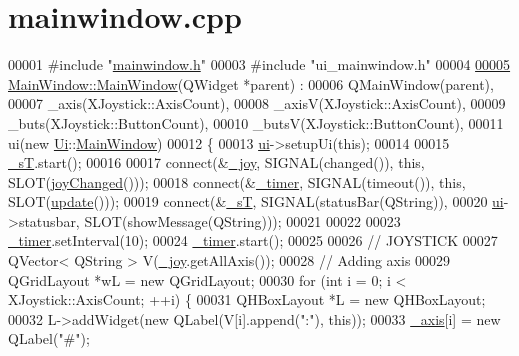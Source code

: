 \hypertarget{a00015_source}{}\section{mainwindow.\+cpp}

\begin{DoxyCode}
00001 \textcolor{preprocessor}{#include "\hyperlink{a00016}{mainwindow.h}"}
00003 \textcolor{preprocessor}{#include "ui\_mainwindow.h"}
00004 
\hypertarget{a00015_source_l00005}{}\hyperlink{a00004_a8b244be8b7b7db1b08de2a2acb9409db}{00005} \hyperlink{a00004_a8b244be8b7b7db1b08de2a2acb9409db}{MainWindow::MainWindow}(QWidget *parent) :
00006     QMainWindow(parent),
00007     \_axis(XJoystick::AxisCount),
00008     \_axisV(XJoystick::AxisCount),
00009     \_buts(XJoystick::ButtonCount),
00010     \_butsV(XJoystick::ButtonCount),
00011     ui(new \hyperlink{a00023}{Ui}::\hyperlink{a00004}{MainWindow})
00012 \{
00013     \hyperlink{a00004_a35466a70ed47252a0191168126a352a5}{ui}->setupUi(\textcolor{keyword}{this});
00014     
00015     \hyperlink{a00004_a97f8ecc7ecb930b796178cef7b975013}{\_sT}.start();
00016     
00017     connect(&\hyperlink{a00004_a671f35800890e518713e1946671d8730}{\_joy}, SIGNAL(changed()), \textcolor{keyword}{this}, SLOT(\hyperlink{a00004_abb4c2d8a79c9f80010ea031366bf8226}{joyChanged}()));
00018     connect(&\hyperlink{a00004_a254b03b878cfda75c1c411a2f8568d33}{\_timer}, SIGNAL(timeout()), \textcolor{keyword}{this}, SLOT(\hyperlink{a00004_a128f71880d4b9683149023fc46fcc9f8}{update}()));
00019     connect(&\hyperlink{a00004_a97f8ecc7ecb930b796178cef7b975013}{\_sT}, SIGNAL(statusBar(QString)), 
00020             \hyperlink{a00004_a35466a70ed47252a0191168126a352a5}{ui}->statusbar, SLOT(showMessage(QString)));
00021     
00022     
00023     \hyperlink{a00004_a254b03b878cfda75c1c411a2f8568d33}{\_timer}.setInterval(10);
00024     \hyperlink{a00004_a254b03b878cfda75c1c411a2f8568d33}{\_timer}.start();
00025     
00026     \textcolor{comment}{// JOYSTICK}
00027     QVector< QString > V(\hyperlink{a00004_a671f35800890e518713e1946671d8730}{\_joy}.getAllAxis());
00028     \textcolor{comment}{// Adding axis}
00029     QGridLayout *wL = \textcolor{keyword}{new} QGridLayout;
00030     \textcolor{keywordflow}{for} (\textcolor{keywordtype}{int} i = 0; i < XJoystick::AxisCount; ++i) \{
00031         QHBoxLayout *L = \textcolor{keyword}{new} QHBoxLayout;
00032         L->addWidget(\textcolor{keyword}{new} QLabel(V[i].append(\textcolor{stringliteral}{":"}), \textcolor{keyword}{this}));
00033         \hyperlink{a00004_a30c99d7a544f74b0650758e5cc7ead5a}{\_axis}[i] = \textcolor{keyword}{new} QLabel(\textcolor{stringliteral}{"#"});

\end{DoxyCode}
